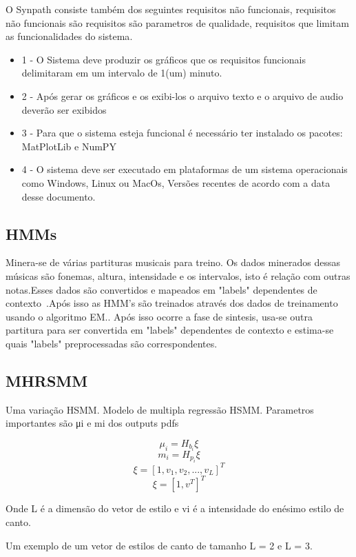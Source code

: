 		O Synpath consiste também dos seguintes requisitos não funcionais, requisitos não funcionais são requisitos são parametros de qualidade, requisitos que limitam as funcionalidades do sistema\cite{SWEBOK}.
		
		\begin{itemize}
			\item 1 - O Sistema deve produzir os gráficos que os requisitos funcionais delimitaram em um intervalo de 1(um) minuto. 
			\item 2  - Após gerar os gráficos e os exibi-los o arquivo texto e o arquivo de audio deverão ser exibidos
			\item 3 - Para que o sistema esteja funcional é necessário ter instalado os pacotes: MatPlotLib e NumPY
			\item 4 - O sistema deve ser executado em plataformas de um sistema operacionais como Windows, Linux ou MacOs, Versões recentes de acordo com a data desse documento. 
			
		\end{itemize}
		
	
	
	\subsection{HMMs}
		Minera-se de várias partituras musicais para treino. Os dados minerados dessas músicas são fonemas, altura, intensidade e os intervalos, isto é relação com outras notas.Esses dados são convertidos e mapeados em "labels" dependentes de contexto~\cite{DegottexNada}.Após isso as HMM's são treinados através dos dados de treinamento usando o algoritmo EM.\cite{GudnasonNada}. Após isso ocorre a fase de sintesis, usa-se outra partitura para ser convertida em "labels" dependentes de contexto e estima-se quais "labels" preprocessadas são correspondentes.\cite{TakashiNose}
	
		\subsection{MHRSMM}
		Uma variação HSMM. Modelo de multipla regressão HSMM.
		Parametros importantes são μi e mi dos outputs pdfs
		
		\[ \mu_i = H_b_i \xi \] 
		\[	m_i   = H_p_i \xi  \]
		\[ \xi   = [1,v_1,v_2,...,v_L]^T \]	
		\[ \xi   = [1,v^T]^T	\]	
		
		Onde L é a dimensão do vetor de estilo e vi  é  a intensidade do  enésimo estilo de canto.
		
		Um exemplo de um vetor de estilos de canto de tamanho L =  2 e L = 3.
		
